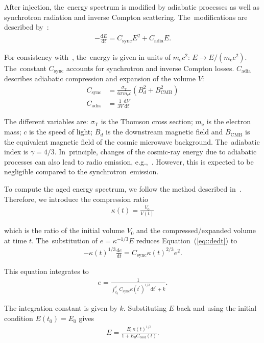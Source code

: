 \documentclass[galaxies,article,accept,moreauthors,pdftex]{mdpi}
\newcommand{\dd}{\mathrm{d}}
\newcommand{\Csync}{C_{\mathrm{sync}}}
\newcommand{\Cadia}{C_{\mathrm{adia}}}
\newcommand{\Ccool}{C_{\mathrm{cool}}}
\newcommand{\me}{m_\mathrm{e}}
\begin{document}
After injection, the~energy spectrum is modified by adiabatic processes as well as synchrotron radiation and inverse Compton scattering. The~modifications are described by~\citep[][]{Kardashev1962}:
\begin{align}
 - \frac{\dd E}{\dd t} = \Csync E^2 + \Cadia E  \label{eq::dedt}.
\end{align}

For consistency with~\cite{2007MNRAS.375...77H}, the~energy is given in units of $\me c^2$: $E\rightarrow E/(\me c^2)$. The~constant $\Csync$ accounts for synchrotron and inverse Compton losses. $\Cadia$ describes adiabatic compression and expansion of the volume $V$:
\begin{align}
 \Csync &= \frac{\sigma_{\mathrm{T}}}{6 \pi m_{\mathrm{e}} c} \left( B_d^2 + B_{\mathrm{CMB}}^2 \right) \\
 \Cadia &= \frac{1}{3 V} \frac{\dd V}{\dd t}
\end{align}

The different variables are: $\sigma_{\mathrm{T}}$ is the Thomson cross section; $\me$ is the electron mass; $c$ is the speed of light; $B_d$ is the downstream magnetic field and $B_{\mathrm{CMB}}$ is the equivalent magnetic field of the cosmic microwave background. The~adiabatic index is $\gamma = 4/3$. In~principle, changes of the cosmic-ray energy due to adiabatic processes can also lead to radio emission, e.g.,~\citep{1981heaa.book.....L}. However, this is expected to be negligible compared to the synchrotron~emission.

To compute the aged energy spectrum, we follow the method described in~\cite{ensslin2001}. Therefore, we introduce the compression ratio
\begin{align}
 \kappa(t) = \frac{V_0}{V(t)} \label{eq::compratio}
\end{align}

which is the ratio of the initial volume $V_0$ and the compressed/expanded volume at time $t$. The~substitution of $e = \kappa^{-1/3} E$ reduces Equation~(\ref{eq::dedt}) to
\begin{align}
 -\kappa(t)^{1/3} \frac{\dd e}{\dd t} = \Csync \kappa(t)^{2/3} e^2.
\end{align}

This equation integrates to
\begin{align}
 e = \frac{1}{\int_{t_0}^{t} \Csync \kappa(t^{\prime})^{1/3} \dd t^{\prime} + k}.
\end{align}

The integration constant is given by $k$. Substituting $E$ back and using the initial condition $E(t_0) = E_0$ gives
\begin{align}
 E = \frac{E_0\kappa(t)^{1/3}}{1 + E_0  \Ccool(t)}.
\end{align}
\end{document}
